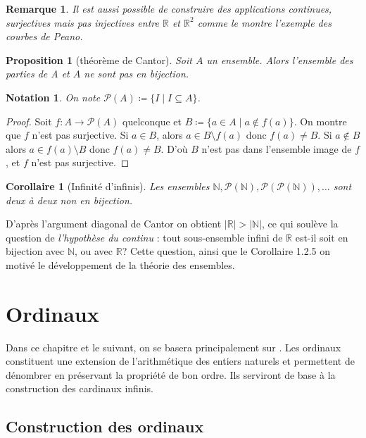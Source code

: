 \documentclass{article}
\theoremstyle{definition}
\theoremstyle{plain}
\newtheorem{proposition}[subsubsection]{Proposition}
\theoremstyle{plain}
\newtheorem{corollary}[subsubsection]{Corollaire}
\theoremstyle{plain}
\theoremstyle{plain}
\newtheorem{remark}[subsubsection]{Remarque}
\theoremstyle{plain}
\newtheorem*{notation}{Notation}
\begin{document}
\begin{remark}
	Il est aussi possible de construire des applications continues, surjectives mais pas injectives entre \( \mathbb{R} \) et \( \mathbb{R}^{2} \) comme le montre l'exemple des courbes de Peano. \cite{peano1890curve}
\end{remark}
\begin{proposition}[théorème de Cantor]
	Soit \( A \) un ensemble. Alors l'ensemble des parties de A et \( A \) ne sont pas en bijection.
\end{proposition} 
\begin{notation}
	On note \( \mathcal{P}(A) \coloneqq \{ I \mid I \subseteq A \}\).	
\end{notation}
\begin{proof}
	Soit \( f : A \rightarrow \mathcal{P}(A) \) quelconque et \( B \coloneqq \{ a \in A \mid a \not\in f(a)\} \). On montre que \( f \) n'est pas surjective. Si \( a \in B \), alors \( a \in B \setminus f(a) \) donc \( f(a) \neq B \). Si \( a \not\in B\) alors \( a \in f(a) \setminus B \) donc \( f(a) \neq B \). D'où \( B \) n'est pas dans l'ensemble image de \( f \), et \( f \) n'est pas surjective.
\end{proof}
\begin{corollary}[Infinité d'infinis]
	Les ensembles \( \mathbb{N}, \mathcal{P}(\mathbb{N}), \mathcal{P}(\mathcal{P}(\mathbb{N})), \ldots \) sont deux à deux non en bijection.
\end{corollary}

D'après l'argument diagonal de Cantor on obtient \( |\mathbb{R}| > |\mathbb{N}| \), ce qui soulève la question de \textit{l'hypothèse du continu} : tout sous-ensemble infini de \( \mathbb{R} \) est-il soit en bijection avec \( \mathbb{N} \), ou avec \( \mathbb{R} \)? Cette question, ainsi que le Corollaire 1.2.5 on motivé le développement de la théorie des ensembles.

\clearpage
\section{Ordinaux}

Dans ce chapitre et le suivant, on se basera principalement sur \cite{dehornoy2017théorie}. Les ordinaux constituent une extension de l'arithmétique des entiers naturels et permettent de dénombrer en préservant la propriété de bon ordre. Ils serviront de base à la construction des cardinaux infinis. 
\subsection{Construction des ordinaux} 
\end{document}
